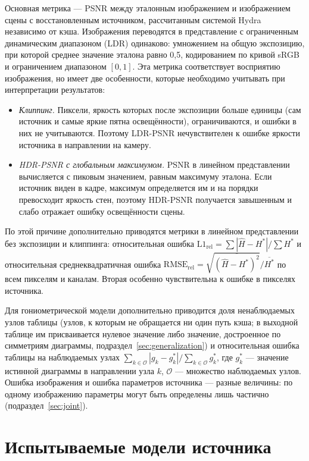 Основная метрика --- PSNR между эталонным изображением и изображением сцены с восстановленным источником, рассчитанным системой Hydra независимо от кэша. Изображения переводятся в представление с ограниченным динамическим диапазоном (LDR) одинаково: умножением на общую экспозицию, при которой среднее значение эталона равно 0,5, кодированием по кривой sRGB и ограничением диапазоном $[0,1]$. Эта метрика соответствует восприятию изображения, но имеет две особенности, которые необходимо учитывать при интерпретации результатов:
\begin{itemize}
    \item \emph{Клиппинг.} Пиксели, яркость которых после экспозиции больше единицы (сам источник и самые яркие пятна освещённости), ограничиваются, и ошибки в них не учитываются. Поэтому LDR-PSNR нечувствителен к ошибке яркости источника в направлении на камеру.
    \item \emph{HDR-PSNR с глобальным максимумом.} PSNR в линейном представлении вычисляется с пиковым значением, равным максимуму эталона. Если источник виден в кадре, максимум определяется им и на порядки превосходит яркость стен, поэтому HDR-PSNR получается завышенным и слабо отражает ошибку освещённости сцены.
\end{itemize}
По этой причине дополнительно приводятся метрики в линейном представлении без экспозиции и клиппинга: относительная ошибка $\mathrm{L1}_{\mathrm{rel}}=\sum|\hat H-H^\ast|/\sum H^\ast$ и относительная среднеквадратичная ошибка $\mathrm{RMSE}_{\mathrm{rel}}=\sqrt{\overline{(\hat H-H^\ast)^2}}/\overline{H^\ast}$ по всем пикселям и каналам. Вторая особенно чувствительна к ошибке в пикселях источника.

Для гониометрической модели дополнительно приводится доля ненаблюдаемых узлов таблицы (узлов, к которым не обращается ни один путь кэша; в выходной таблице им присваивается нулевое значение либо значение, достроенное по симметриям диаграммы, подраздел~\ref{sec:generalization}) и относительная ошибка таблицы на наблюдаемых узлах $\sum_{k\in\mathcal{O}}|g_k-g^\ast_k|/\sum_{k\in\mathcal{O}}g^\ast_k$, где $g^\ast_k$ --- значение истинной диаграммы в направлении узла $k$, $\mathcal{O}$ --- множество наблюдаемых узлов. Ошибка изображения и ошибка параметров источника --- разные величины: по одному изображению параметры могут быть определены лишь частично (подраздел~\ref{sec:joint}).

\section{Испытываемые модели источника}

